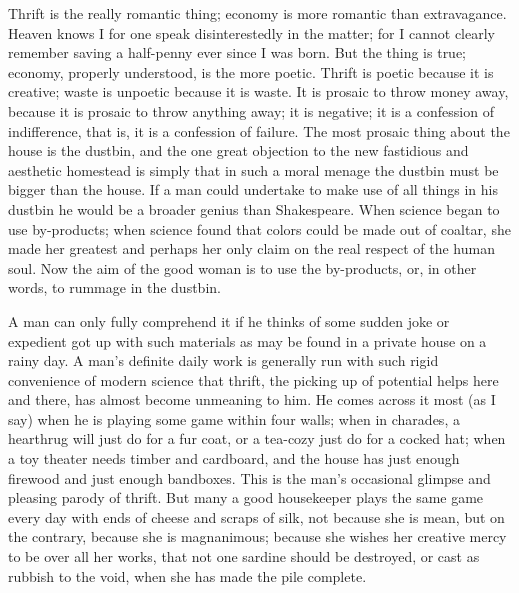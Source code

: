 \documentclass[final,10pt,letterpaper,twocolumn,openany]{book}
\begin{document}
Thrift is the really romantic thing; economy is more romantic than
extravagance. Heaven knows I for one speak disinterestedly in the matter;
for I cannot clearly remember saving a half-penny ever since I was born.
But the thing is true; economy, properly understood, is the more poetic.
Thrift is poetic because it is creative; waste is unpoetic because it is waste.
It is prosaic to throw money away, because it is prosaic to throw anything
away; it is negative; it is a confession of indifference, that is, it is a
confession of failure. The most prosaic thing about the house is the
dustbin, and the one great objection to the new fastidious and aesthetic
homestead is simply that in such a moral menage the dustbin must be
bigger than the house. If a man could undertake to make use of all things
in his dustbin he would be a broader genius than Shakespeare. When
science began to use by-products; when science found that colors could be
made out of coaltar, she made her greatest and perhaps her only claim on
the real respect of the human soul. Now the aim of the good woman is to
use the by-products, or, in other words, to rummage in the dustbin.

A man can only fully comprehend it if he thinks of some sudden joke
or expedient got up with such materials as may be found in a private house
on a rainy day. A man's definite daily work is generally run with such rigid
convenience of modern science that thrift, the picking up of potential helps
here and there, has almost become unmeaning to him. He comes across it
most (as I say) when he is playing some game within four walls; when in
charades, a hearthrug will just do for a fur coat, or a tea-cozy just do for a
cocked hat; when a toy theater needs timber and cardboard, and the house
has just enough firewood and just enough bandboxes. This is the man's
occasional glimpse and pleasing parody of thrift. But many a good
housekeeper plays the same game every day with ends of cheese and
scraps of silk, not because she is mean, but on the contrary, because she is
magnanimous; because she wishes her creative mercy to be over all her
works, that not one sardine should be destroyed, or cast as rubbish to the
void, when she has made the pile complete.
\end{document}
